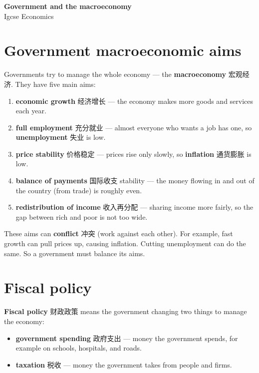 \documentclass[11pt]{article}
\begin{document}
\begin{center}
  {\LARGE\bfseries Government and the macroeconomy}\\[0.35em]
  {\large Igcse Economics}
\end{center}
\vspace{0.6em}

\section*{Government macroeconomic aims}

Governments try to manage the whole economy — the \textbf{macroeconomy} 宏观经济. They have five main aims:

\begin{enumerate}
\item \textbf{economic growth} 经济增长 — the economy makes more goods and services each year.

\item \textbf{full employment} 充分就业 — almost everyone who wants a job has one, so \textbf{unemployment} 失业 is low.

\item \textbf{price stability} 价格稳定 — prices rise only slowly, so \textbf{inflation} 通货膨胀 is low.

\item \textbf{balance of payments} 国际收支 stability — the money flowing in and out of the country (from trade) is roughly even.

\item \textbf{redistribution of income} 收入再分配 — sharing income more fairly, so the gap between rich and poor is not too wide.

\end{enumerate}

These aims can \textbf{conflict} 冲突 (work against each other). For example, fast growth can pull prices up, causing inflation. Cutting unemployment can do the same. So a government must balance its aims.

\section*{Fiscal policy}

\textbf{Fiscal policy} 财政政策 means the government changing two things to manage the economy:

\begin{itemize}
\item \textbf{government spending} 政府支出 — money the government spends, for example on schools, hospitals, and roads.

\item \textbf{taxation} 税收 — money the government takes from people and firms.

\end{itemize}
\end{document}
